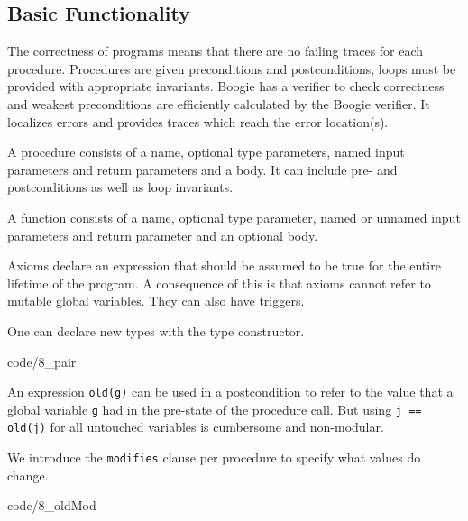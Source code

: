 \subsection{Basic Functionality}
\begin{mytitle} The correctness of programs means that there are no failing traces for each procedure. Procedures are given preconditions and postconditions, loops must be provided with appropriate invariants. Boogie has a verifier to check correctness and weakest preconditions are efficiently calculated by the Boogie verifier. It localizes errors and provides traces which reach the error location(s).
\end{mytitle}
\begin{mytitle}[Procedures] A procedure consists of a name, optional type parameters, named input parameters and return parameters and a body. It can include pre- and postconditions as well as loop invariants.
\end{mytitle}
\begin{mytitle}[Functions] A function consists of a name, optional type parameter, named or unnamed input parameters and return parameter and an optional body.
\end{mytitle}
\begin{mytitle}[Axioms] Axioms declare an expression that should be assumed to be true for the entire lifetime of the program. A consequence of this is that axioms cannot refer to mutable global variables. They can also have triggers.
\end{mytitle}
\begin{mytitle} One can declare new types with the type constructor.
\end{mytitle}
 {code/8_pair}
\begin{mytitle} An expression \texttt{old(g)} can be used in a postcondition to refer to the value that a global variable \texttt{g} had in the pre-state of the procedure call. But using \texttt{j == old(j)} for all untouched variables is cumbersome and non-modular.
\end{mytitle}
\begin{mytitle} We introduce the \texttt{modifies} clause per procedure to specify what values do change.
\end{mytitle}
 {code/8_oldMod}

